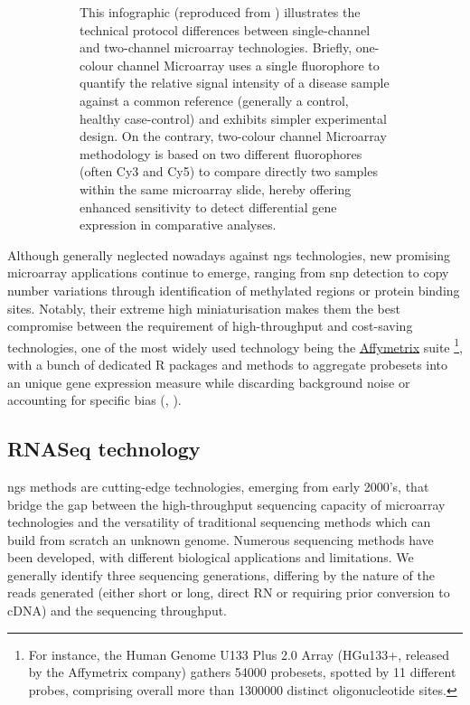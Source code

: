\begin{figure}
\begin{subfigure}[p]{0.55\textwidth}
         \label{subfig:one-vs-two-channel}
         \caption[\textbf{a) Two-channel and b) Single-channel microarray platforms}]{This infographic (reproduced from \autocite[Fig. 6]{dawany23}) illustrates the technical protocol differences between single-channel and two-channel microarray technologies. Briefly, one-colour channel Microarray uses a single fluorophore to quantify the relative signal intensity of a disease sample against a common reference (generally a control, healthy case-control) and exhibits simpler experimental design. On the contrary, two-colour channel Microarray methodology is based on two different fluorophores (often Cy3 and Cy5) to compare directly two samples within the same microarray slide, hereby offering enhanced sensitivity to detect differential gene expression in comparative analyses.}
     \end{subfigure}
   \caption[A brief overview of micro-array chips to quantify the transcriptome]{}
    \label{fig:microarray-technology}
\end{figure}

Although generally neglected nowadays against \acrshort{ngs} technologies, new promising microarray applications continue to emerge, ranging from \acrshort{snp} detection to copy number variations through identification of methylated regions or protein binding sites. Notably, their extreme high miniaturisation makes them the best compromise between the requirement of high-throughput and cost-saving technologies, one of the most widely used technology being the \href{https://www.affymetrix.com/support/downloads/manuals/chas_2_1_user_manual.pdf}{Affymetrix} suite \footnote{For instance, the Human Genome U133 Plus 2.0 Array (HGu133+, released by the Affymetrix company) gathers \num{54000} probesets, spotted by 11 different probes, comprising overall more than \num{1300000} distinct oligonucleotide sites.}, with a bunch of dedicated R packages and methods to aggregate probesets into an unique gene expression measure while discarding background noise or accounting for specific bias (\autocite{gautier_etal04}, \autocite{irizarry_etal03}).


\subsection{RNASeq technology}
\label{subsec:RNASeq}
\acrfull{ngs} methods are cutting-edge technologies, emerging from early 2000's, that bridge the gap between the high-throughput sequencing capacity of microarray technologies and the versatility of traditional sequencing methods which can build from scratch an unknown genome. Numerous sequencing methods have been developed, with different biological applications and limitations. We generally identify three sequencing generations, differing by the nature of the reads generated (either short or long, direct RN or requiring prior conversion to cDNA) and the sequencing throughput.


